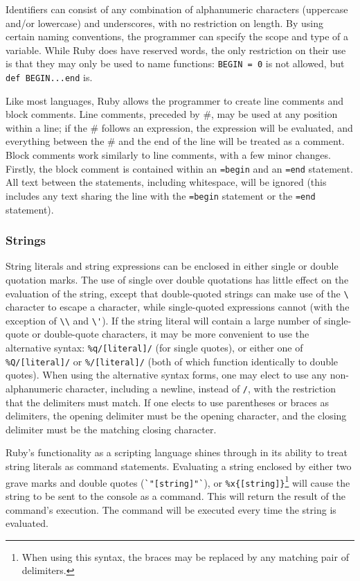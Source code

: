 \documentclass[12pt]{article}
\begin{document}
Identifiers can consist of any combination of alphanumeric characters (uppercase and/or lowercase) and underscores, with no restriction on length. By using certain naming conventions, the programmer can specify the scope and type of a variable. While Ruby does have reserved words, the only restriction on their use is that they may only be used to name functions: \verb|BEGIN = 0| is not allowed, but \verb|def BEGIN...end| is\cite{syntut}\cite{huihoo}.

Like most languages, Ruby allows the programmer to create line comments and block comments. Line comments, preceded by \#, may be used at any position within a line; if the \# follows an expression, the expression will be evaluated, and everything between the \# and the end of the line will be treated as a comment. Block comments work similarly to line comments, with a few minor changes. Firstly, the block comment is contained within an \verb|=begin| and an \verb|=end| statement. All text between the statements, including whitespace, will be ignored (this includes any text sharing the line with the \verb|=begin| statement or the \verb|=end| statement)\cite{syntut}\cite{huihoo}.

\subsubsection{Strings}

String literals and string expressions can be enclosed in either single or double quotation marks. The use of single over double quotations has little effect on the evaluation of the string, except that double-quoted strings can make use of the \verb|\| character to escape a character, while single-quoted expressions cannot (with the exception of \verb|\\| and \verb|\'|). If the string literal will contain a large number of single-quote or double-quote characters, it may be more convenient to use the alternative syntax: \verb|%q/[literal]/| (for single quotes), or either one of \verb|%Q/[literal]/| or \verb|%/[literal]/| (both of which function identically to double quotes). When using the alternative syntax forms, one may elect to use any non-alphanumeric character, including a newline, instead of \verb|/|, with the restriction that the delimiters must match. If one elects to use parentheses or braces as delimiters, the opening delimiter must be the opening character, and the closing delimiter must be the matching closing character\cite{huihoo}.

Ruby's functionality as a scripting language shines through in its ability to treat string literals as command statements. Evaluating a string enclosed by either two grave marks and double quotes (\verb|`"[string]"`|), or \verb|%x{[string]}|\footnote{When using this syntax, the braces may be replaced by any matching pair of delimiters.} will cause the string to be sent to the console as a command. This will return the result of the command's execution. The command will be executed every time the string is evaluated\cite{huihoo}.
\end{document}
